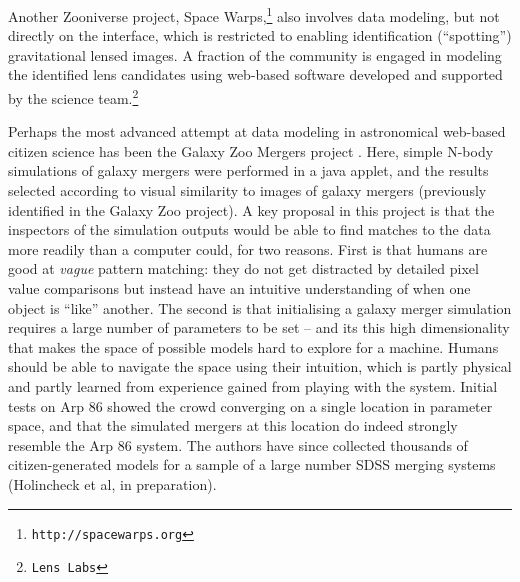 \documentclass{ar2e}
\begin{document}
Another Zooniverse project, Space
Warps,\footnote{\texttt{http://spacewarps.org}} also involves data modeling,
but not directly on the interface, which is restricted to enabling
identification (``spotting'') gravitational lensed images. A fraction of the
community is engaged in modeling the  identified lens candidates using
web-based software developed and supported  by the science
team.\footnote{\texttt{Lens Labs}} 

Perhaps the most advanced attempt at data modeling in astronomical web-based
citizen science has been the Galaxy Zoo Mergers project
\citep{HolincheckEtal2010,WallinEtal2010}. Here, simple N-body simulations of
galaxy mergers were performed in a java applet, and the results selected
according to visual similarity to images of galaxy mergers (previously
identified in the Galaxy Zoo project). A key proposal in this project is that
the inspectors of the simulation outputs would be able to find matches to the
data more readily than a computer could, for two reasons. First is that humans
are good at {\it vague} pattern matching: they do not get distracted by
detailed pixel value comparisons but instead have an intuitive understanding
of when one object is ``like'' another. The second is that initialising a
galaxy merger simulation requires a large number of parameters to be set --
and its this high dimensionality  that makes the space of possible models hard
to explore for a machine. Humans should be able to navigate the space using
their intuition, which is partly physical and partly learned from experience
gained from playing with the system. Initial tests on Arp 86  showed the crowd
converging on a single location in parameter space, and that the simulated
mergers at this location do indeed strongly resemble the Arp 86 system. The
authors have since collected thousands of citizen-generated models for a
sample of a large number SDSS merging systems (Holincheck et al, in
preparation). 
\end{document}
